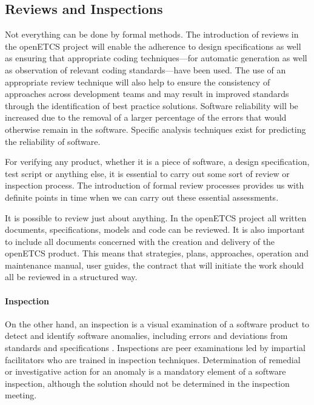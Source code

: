 \documentclass{template/openetcs_report}
\begin{document}
\subsection{Reviews and Inspections}
\label{sec:reviews-inspec}

Not everything can be done by formal methods. The introduction of reviews
 in the openETCS project will enable the
adherence to design specifications as well as ensuring that
appropriate coding techniques---for automatic generation as well as 
observation of relevant coding
standards---have been used.  The use of an appropriate review technique
will also help to ensure the consistency of approaches across development teams
and may result in improved standards through the identification of
best practice solutions.  Software reliability will be increased due
to the removal of a larger percentage of the errors that would
otherwise remain in the software. Specific analysis techniques
exist for predicting the reliability of software.

For verifying any product, whether it is a piece of
software, a design specification, test script or anything else, it is 
essential to carry out some sort of review or inspection process. 
The introduction of formal review processes provides us with 
definite points in time when we can carry out these essential 
assessments.

It is possible to review just about anything. In the openETCS project
all written documents, specifications, models and code can be
reviewed. It is also important to include all documents concerned with
the creation and delivery of the openETCS product. This means that
strategies, plans, approaches, operation and maintenance manual, user
guides, the contract that will initiate the work should all be
reviewed in a structured way.

\paragraph{Inspection}
On the other hand, an inspection is a visual examination of a software
product to detect and identify software anomalies, including errors
and deviations from standards and specifications \cite{inspection}. Inspections are peer
examinations led by impartial facilitators who are trained in
inspection techniques. Determination of remedial or investigative
action for an anomaly is a mandatory element of a software inspection,
although the solution should not be determined in the inspection
meeting.
\end{document}
